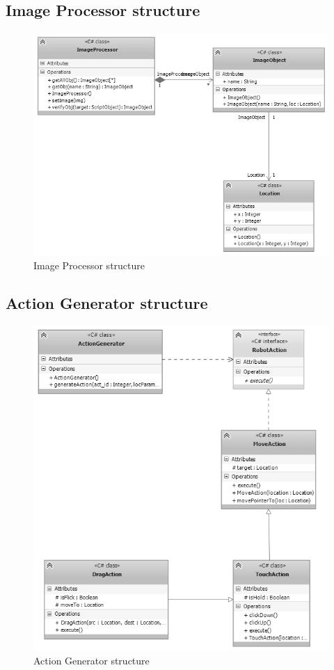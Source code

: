 \subsection{Image Processor structure}
	\begin{figure}[H]
		\centering
		\includegraphics[scale=0.75]{Chapters/Fig/img_processor.png}
		\caption{Image Processor structure}
		\label{fig:img_processor}
	\end{figure}

\subsection{Action Generator structure}
	\begin{figure}[H]
		\centering
		\includegraphics[scale=0.75]{Chapters/Fig/act_gen.png}
		\caption{Action Generator structure}
		\label{fig:act_gen}
	\end{figure}

